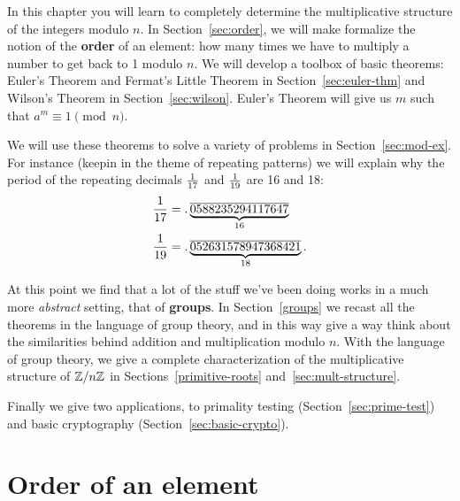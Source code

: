 In this chapter you will learn to completely determine the multiplicative structure of the integers modulo $n$. In Section~\ref{sec:order}, we will make formalize the notion of the \textbf{order} of an element: how many times we have to multiply a number to get back to 1 modulo $n$. We will develop a toolbox of basic theorems: Euler's Theorem and Fermat's Little Theorem in Section~\ref{sec:euler-thm} and Wilson's Theorem in Section~\ref{sec:wilson}. Euler's Theorem will give us $m$ such that  $a^m\equiv 1\pmod{n}$.

We will use these theorems to solve a variety of problems in Section~\ref{sec:mod-ex}. For instance (keepin in the theme of repeating patterns) we will explain why the period of the repeating decimals $\frac{1}{17}$ and $\frac{1}{19}$ are 16 and 18:
\begin{align*}
\frac{1}{17}&=.\underbrace{\overline{0588235294117647}}_{16}\\
\frac{1}{19}&=.\underbrace{\overline{052631578947368421}}_{18}.
\end{align*}

At this point we find that a lot of the stuff we've been doing works in a much more {\it abstract} setting, that of \textbf{groups}. In Section~\ref{groups} we recast all the theorems in the language of group theory, and in this way give a way think about the similarities behind addition and multiplication modulo $n$. With the language of group theory, we give a complete characterization of the multiplicative structure of $\mathbb{Z}/n\mathbb{Z}$ in Sections~\ref{primitive-roots} and~\ref{sec:mult-structure}.

Finally we give two applications, to primality testing (Section~\ref{sec:prime-test}) and basic cryptography (Section~\ref{sec:basic-crypto}).

\section{Order of an element}

